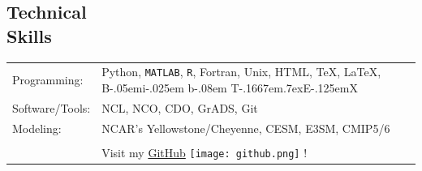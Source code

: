 \documentclass[margin,line,palatino,courier,10pt]{res}
\def\BibTeX{{\rm B\kern-.05em{\sc i\kern-.025em b}\kern-.08em
    T\kern-.1667em\lower.7ex\hbox{E}\kern-.125emX}}
\begin{document}
\begin{resume}
\section{\sc \textcolor{Cerulean}{\large{\textbf{Technical \\ Skills}}}}
\vspace*{0.05in}
\begin{tabular}{@{}p{0.9in}p{6in}}

Programming: & Python, \texttt{MATLAB}, \texttt{R}, Fortran, Unix, HTML, \TeX, \LaTeX, \BibTeX \\
Software/Tools: & NCL, NCO, CDO, GrADS, Git\\
Modeling: & NCAR's Yellowstone/Cheyenne, CESM, E3SM, CMIP5/6\\\\

& Visit my \href{https://github.com/zmlabe}{GitHub} \texttt{[image: github.png]} !\\
\end{tabular}

\vspace{-0.1in}
\noindent\textcolor{Cerulean}{\makebox[\linewidth][r]{\rule{\textwidth}{5pt}}}
\vspace{-0.3in}


\end{resume}
\end{document}
